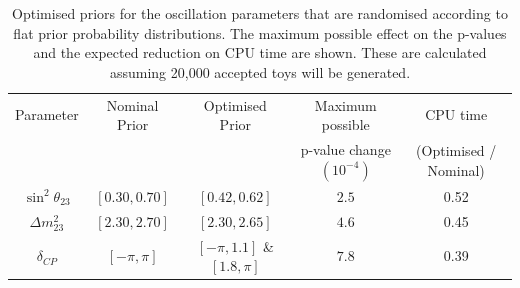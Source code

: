 \begin{table}[H]
\centering
\begin{tabular}{| c | c | c | c | c |}
	\hline
	Parameter            & Nominal Prior  & Optimised Prior               & Maximum possible           & CPU time \\
	                     &                &                               & p-value change $(10^{-4})$ & (Optimised / Nominal) \\
	\hline
	$\sin^2 \theta_{23}$ & $[0.30, 0.70]$ & $[0.42, 0.62]$                & $2.5$                      & 0.52 \\
	$\Delta m^2_{23}$    & $[2.30, 2.70]$ & $[2.30, 2.65]$                & $4.6$                      & 0.45 \\
	$\delta_{CP}$        & $[-\pi, \pi]$  & $[-\pi, 1.1]$ \& $[1.8, \pi]$ & $7.8$                      & 0.39 \\
	\hline
\end{tabular}
\caption{
	Optimised priors for the oscillation parameters that are randomised according to flat prior probability distributions. The maximum possible effect on the p-values and the expected reduction on CPU time are shown. These are calculated assuming 20,000 accepted toys will be generated.
}
\label{tab:vary_prior_all}
\end{table}




